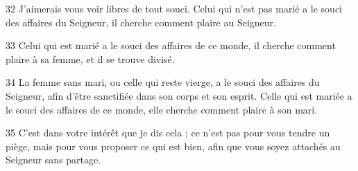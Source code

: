 
32 J’aimerais vous voir libres de tout souci. Celui qui n’est pas marié a le souci des affaires du Seigneur, il cherche comment plaire au Seigneur.

33 Celui qui est marié a le souci des affaires de ce monde, il cherche comment plaire à sa femme, et il se trouve divisé.

34 La femme sans mari, ou celle qui reste vierge, a le souci des affaires du Seigneur, afin d’être sanctifiée dans son corps et son esprit. Celle qui est mariée a le souci des affaires de ce monde, elle cherche comment plaire à son mari.

35 C’est dans votre intérêt que je dis cela ; ce n’est pas pour vous tendre un piège, mais pour vous proposer ce qui est bien, afin que vous soyez attachés au Seigneur sans partage.
